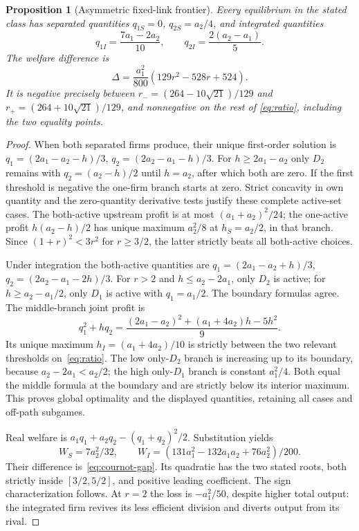 \documentclass[11pt,a4paper]{article}
\numberwithin{equation}{section}
\newtheorem{proposition}[theorem]{Proposition}
\theoremstyle{definition}
\begin{document}
\begin{proposition}[Asymmetric fixed-link frontier]\label{prop:cournot}
Every equilibrium in the stated class has separated quantities
$q_{1S}=0$, $q_{2S}=a_2/4$, and integrated quantities
\[
 q_{1I}=\frac{7a_1-2a_2}{10},\qquad
 q_{2I}=\frac{2(a_2-a_1)}5.
\]
The welfare difference is
\begin{equation}\label{eq:cournot-gap}
 \Delta=\frac{a_1^2}{800}(129r^2-528r+524).
\end{equation}
It is negative precisely between
$r_-=(264-10\sqrt{21})/129$ and
$r_+=(264+10\sqrt{21})/129$, and nonnegative on the rest of
\eqref{eq:ratio}, including the two equality points.
\end{proposition}
\begin{proof}
When both separated firms produce, their unique first-order solution is
$q_1=(2a_1-a_2-h)/3$, $q_2=(2a_2-a_1-h)/3$.
For $h\ge2a_1-a_2$ only $D_2$ remains with
$q_2=(a_2-h)/2$ until $h=a_2$, after which both are zero.
If the first threshold is negative the one-firm branch starts at zero.
Strict concavity in own quantity and the zero-quantity derivative tests
justify these complete active-set cases.
The both-active upstream profit is at most $(a_1+a_2)^2/24$;
the one-active profit $h(a_2-h)/2$ has unique maximum $a_2^2/8$
at $h_S=a_2/2$, in that branch. Since $(1+r)^2<3r^2$ for
$r\ge3/2$, the latter strictly beats all both-active choices.

Under integration the both-active quantities are
$q_1=(2a_1-a_2+h)/3$, $q_2=(2a_2-a_1-2h)/3$.
For $r>2$ and $h\le a_2-2a_1$, only $D_2$ is active; for
$h\ge a_2-a_1/2$, only $D_1$ is active with $q_1=a_1/2$.
The boundary formulas agree. The middle-branch joint profit is
\[
 q_1^2+hq_2
  =\frac{(2a_1-a_2)^2+(a_1+4a_2)h-5h^2}{9}.
\]
Its unique maximum $h_I=(a_1+4a_2)/10$ is strictly between the
two relevant thresholds on~\eqref{eq:ratio}. The low only-$D_2$
branch is increasing up to its boundary, because
$a_2-2a_1<a_2/2$; the high only-$D_1$ branch is constant
$a_1^2/4$. Both equal the middle formula at the boundary and are
strictly below its interior maximum. This proves global optimality
and the displayed quantities, retaining all cases and off-path subgames.

Real welfare is $a_1q_1+a_2q_2-(q_1+q_2)^2/2$. Substitution yields
\[
 W_S=7a_2^2/32,\qquad
 W_I=(131a_1^2-132a_1a_2+76a_2^2)/200.
\]
Their difference is~\eqref{eq:cournot-gap}. Its quadratic has the
two stated roots, both strictly inside $[3/2,5/2]$, and positive leading
coefficient. The sign characterization follows. At $r=2$ the loss
is $-a_1^2/50$, despite higher total output: the integrated firm
revives its less efficient division and diverts output from its rival.
\end{proof}
\end{document}
